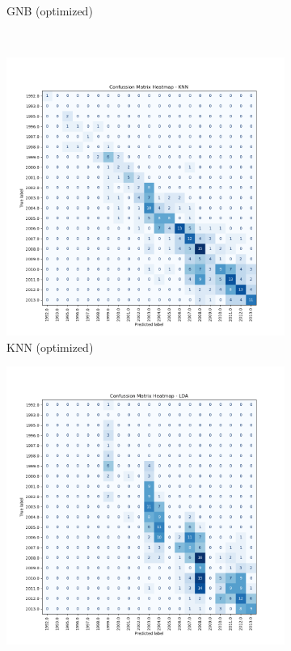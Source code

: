 \documentclass[conference,onecolumn]{IEEEtran}
\begin{document}
\begin{figure}
\begin{subfigure}{0.4\textwidth}
            \caption{GNB (optimized)}
            \label{appx:cmheatmapgnb}
        \end{subfigure}\\
        \begin{subfigure}{0.4\textwidth}
            \centering
            \includegraphics[width=\linewidth]{Plots/CM_Heatmap_KNN.png}
            \caption{KNN (optimized)}
            \label{appx:cmheatmapknn}
        \end{subfigure}%
        \begin{subfigure}{0.4\textwidth}
            \centering
            \includegraphics[width=\linewidth]{Plots/CM_Heatmap_LDA.png}

\end{subfigure}
\end{figure}
\end{document}

